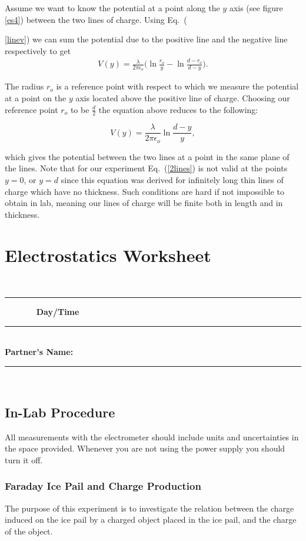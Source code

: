 {{Assume we want to know the potential at a point along the $y$ axis
(see figure \ref{es4}) between the two lines of charge. Using
Eq.~({\ref{linev}) we can sum the potential due to the positive
line and the negative line respectively to get
\begin{eqnarray*}
V(y)=
\frac{\lambda}{2\pi\epsilon_o}\big(\ln{\frac{r_o}{y}}-\ln{\frac{d-r_o}{d-y}}\big).
\label{exv}
\end{eqnarray*}

The radius $r_o$ is a reference point with respect to which we
measure the potential at a point on the $y$ axis located above the
positive line of charge.  Choosing our reference point $r_o$ to be
$\frac{d}{2}$ the equation above reduces to the following:

\begin{equation}
V(y)=\frac{\lambda}{2\pi\epsilon_o}\ln{\frac{d-y}{y}},\label{2lines}
\end{equation}

\noindent which gives the potential between the two lines at a
point in the same plane of the lines.  Note that for our
experiment Eq.~(\ref{2lines}) is not valid at the points $y=0$, or
$y=d$ since this equation was derived for infinitely long thin
lines of charge which have no thickness.  Such conditions are hard
if not impossible to obtain in lab, meaning our lines of charge
will be finite both in length and in thickness.

\vfill
\clearpage

\renewcommand{\thesection}{\thechapter.W}
\section{Electrostatics Worksheet}
~\rule{5.0cm}{0.1mm}~~~~~~~ {\bf\Large
Day/Time}~\rule{3cm}{.1mm}\\
{\bf\Large Partner's Name:}~\rule{6cm}{.1mm}\\
\noindent
\subsection{In-Lab Procedure}

All measurements with the electrometer should include units and
uncertainties in the space provided. Whenever you are not using
the power supply you should turn it off.

\subsubsection{Faraday Ice Pail and Charge Production}
The purpose of this experiment is to investigate the relation
between the charge induced on the ice pail by a charged object
placed in the ice pail, and the charge of the object.

}}}
